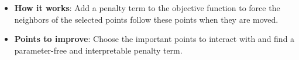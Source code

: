 \documentclass[portrait,final,a0paper]{nadiposter}
\begin{document}
\begin{poster}
{\begin{minipage}{0.1\linewidth}
\end{minipage}
\begin{minipage}{0.45\linewidth}
\noindent
\begin{itemize}
    \item \textbf{How it works}: Add a {\color{red} penalty term} to the objective function to force the {\color{blue} neighbors} of the selected points follow these points when they are moved.
    \item \textbf{Points to improve}: Choose the important points to interact with and find a parameter-free and interpretable penalty term.
\end{itemize}
\end{minipage}
}



\end{poster}
\end{document}
